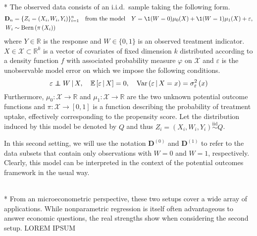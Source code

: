 \begin{boxD}
	\begin{asm}\label{asm:CATE_dgp}\mbox{}\\*
		The observed data consists of an i.i.d.\ sample taking the following form.
		\begin{equation}\label{DGP2}
			\begin{aligned}
				\mathbf{D}_n & = \{Z_{i} = (X_{i}, W_{i}, Y_{i})\}_{i = 1}^{n}
				\quad \text{from the model} \quad
				Y = \1(W = 0)\mu_{0}(X) + \1(W = 1)\mu_1(X) + \varepsilon,	\\
				W_{i} & \sim \operatorname{Bern}\left(\pi\left(X_{i}\right)\right)
			\end{aligned}
		\end{equation}
		where $Y \in \mathbb{R}$ is the response and $W \in \{0,1\}$ is an observed treatment indicator.
		$X \in \mathcal{X} \subset \mathbb{R}^k$ is a vector of covariates of fixed dimension $k$ distributed according to a density function $f$ with associated probability measure $\varphi$ on $\mathcal{X}$ and $\varepsilon$ is the unobservable model error on which we impose the following conditions.
		\begin{equation}
			\varepsilon \perp\!\!\!\!\perp W \, | \, X, \quad
			\mathbb{E}\left[\varepsilon \, | \, X\right] = 0, \quad
			\text{Var}\left(\varepsilon \, | \, X = x\right) = \sigma_{\varepsilon}^2\left(x\right)
		\end{equation}
		Furthermore, $\mu_0:\mathcal{X} \rightarrow \mathbb{R}$ and $\mu_1:\mathcal{X} \rightarrow \mathbb{R}$ are the two unknown potential outcome functions and $\pi:\mathcal{X} \rightarrow [0,1]$ is a function describing the probability of treatment uptake, effectively corresponding to the propensity score.
		Let the distribution induced by this model be denoted by $Q$ and thus $Z_{i} = \left(X_{i}, W_{i}, Y_{i}\right) \overset{\text{iid}}{\sim} Q$.
	\end{asm}
\end{boxD}
In this second setting, we will use the notation $\mathbf{D}^{(0)}$ and $\mathbf{D}^{(1)}$ to refer to the data subsets that contain only observations with $W = 0$ and $W = 1$, respectively.
Clearly, this model can be interpreted in the context of the potential outcomes framework in the usual way.
\begin{boxD}
	\begin{rmk}\mbox{}\\*
		From an microeconometric perspective, these two setups cover a wide array of applications.
		While nonparametric regression is itself often advantageous to answer economic questions, the real strengths show when considering the second setup.
		{\color{red} LOREM IPSUM}
	\end{rmk}
\end{boxD}

